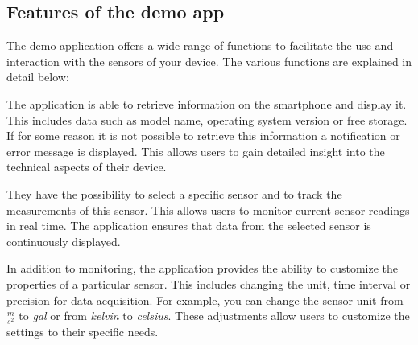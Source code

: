 \documentclass[12pt]{article}
\newcounter{fr}
\begin{document}
\subsection{Features of the demo app}
    The demo application offers a wide range of functions to facilitate the use and interaction with the sensors of your device. The various functions are explained in detail below: 
\begin{itemize}
    
    \item[1.]
    
    \begin{minipage}[t]{0.6\textwidth}
        The application is able to retrieve information on the smartphone and display it. This includes data such as model name, operating system version or free storage. If for some reason it is not possible to retrieve this information a notification or error message is displayed. This allows users to gain detailed insight into the technical aspects of their device. 
     \item[2.] They have the possibility to select a specific sensor and to track the measurements of this sensor. This allows users to monitor current sensor readings in real time. The application ensures that data from the selected sensor is continuously displayed.
    \item[3.] In addition to monitoring, the application provides the ability to customize the properties of a particular sensor. This includes changing the unit, time interval or precision for data acquisition. For example, you can change the sensor unit from $\frac{m}{s^2}$ to \textit{gal} or from \textit{kelvin} to \textit{celsius}. These adjustments allow users to customize the settings to their specific needs. 
    \end{minipage} 
    \hfill
     \begin{minipage}[t]{0.3\textwidth}
        \vspace{-\baselineskip}

\end{minipage}
\end{itemize}
\end{document}
